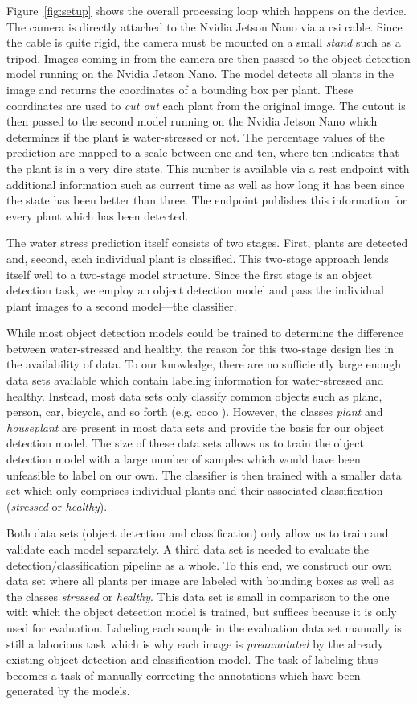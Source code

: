\documentclass[draft,final]{vutinfth} %
\begin{document}
Figure~\ref{fig:setup} shows the overall processing loop which happens
on the device. The camera is directly attached to the Nvidia Jetson
Nano via a \gls{csi} cable. Since the cable is quite rigid, the camera
must be mounted on a small \emph{stand} such as a tripod. Images
coming in from the camera are then passed to the object detection
model running on the Nvidia Jetson Nano. The model detects all plants
in the image and returns the coordinates of a bounding box per
plant. These coordinates are used to \emph{cut out} each plant from
the original image. The cutout is then passed to the second model
running on the Nvidia Jetson Nano which determines if the plant is
water-stressed or not. The percentage values of the prediction are
mapped to a scale between one and ten, where ten indicates that the
plant is in a very dire state. This number is available via a
\gls{rest} endpoint with additional information such as current time
as well as how long it has been since the state has been better than
three. The endpoint publishes this information for every plant which
has been detected.

The water stress prediction itself consists of two stages. First,
plants are detected and, second, each individual plant is
classified. This two-stage approach lends itself well to a two-stage
model structure. Since the first stage is an object detection task, we
employ an object detection model and pass the individual plant images
to a second model---the classifier.

While most object detection models could be trained to determine the
difference between water-stressed and healthy, the reason for this
two-stage design lies in the availability of data. To our knowledge,
there are no sufficiently large enough data sets available which
contain labeling information for water-stressed and healthy. Instead,
most data sets only classify common objects such as plane, person,
car, bicycle, and so forth (e.g. \gls{coco} \cite{lin2015}). However,
the classes \emph{plant} and \emph{houseplant} are present in most
data sets and provide the basis for our object detection model. The
size of these data sets allows us to train the object detection model
with a large number of samples which would have been unfeasible to
label on our own. The classifier is then trained with a smaller data
set which only comprises individual plants and their associated
classification (\emph{stressed} or \emph{healthy}).

Both data sets (object detection and classification) only allow us to
train and validate each model separately. A third data set is needed
to evaluate the detection/classification pipeline as a whole. To this
end, we construct our own data set where all plants per image are
labeled with bounding boxes as well as the classes \emph{stressed} or
\emph{healthy}. This data set is small in comparison to the one with
which the object detection model is trained, but suffices because it
is only used for evaluation. Labeling each sample in the evaluation
data set manually is still a laborious task which is why each image is
\emph{preannotated} by the already existing object detection and
classification model. The task of labeling thus becomes a task of
manually correcting the annotations which have been generated by the
models.
\end{document}
